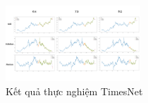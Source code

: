 \begin{figure}[H]
	\centerline{\includegraphics[width=0.45\textwidth]{img/TimesNet_result.png}}
	\caption{Kết quả thực nghiệm TimesNet}
	\label{fig}
\end{figure}